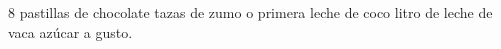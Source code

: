 \documentclass{article}
\begin{document}
  \begin{multicols}{2}
  \noindent \color{light}
      8 pastillas de chocolate tazas de zumo o primera leche de coco litro de leche de vaca\newline
      azúcar a gusto.\newline
    \end{multicols}
  \vspace{1cm}
\end{document}
